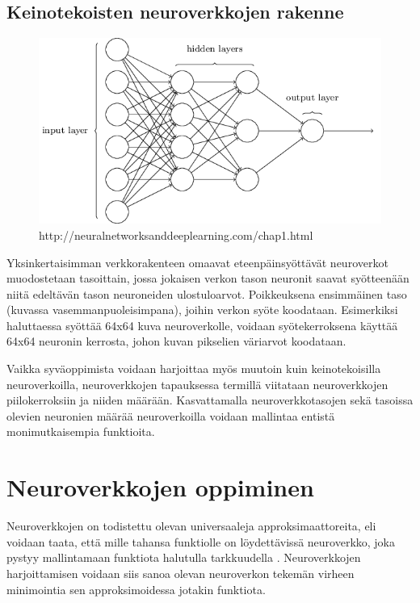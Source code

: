 \documentclass[finnish]{tktltiki2}
\theoremstyle{definition}
\theoremstyle{remark}
\begin{document}
  \subsection{Keinotekoisten neuroverkkojen rakenne}

  \begin{figure}[h]
  \label{pic:neuralnet}
  \centering
  \includegraphics[scale=0.5]{basic-neuralnet}
  \caption{http://neuralnetworksanddeeplearning.com/chap1.html}
  \end{figure}

  Yksinkertaisimman verkkorakenteen omaavat eteenpäinsyöttävät neuroverkot muodostetaan tasoittain, jossa jokaisen verkon tason neuronit saavat syötteenään niitä edeltävän tason neuroneiden ulostuloarvot. Poikkeuksena ensimmäinen taso (kuvassa vasemmanpuoleisimpana), joihin verkon syöte koodataan. Esimerkiksi haluttaessa syöttää 64x64 kuva neuroverkolle, voidaan syötekerroksena käyttää 64x64 neuronin kerrosta, johon kuvan pikselien väriarvot koodataan.

  Vaikka syväoppimista voidaan harjoittaa myös muutoin kuin keinotekoisilla neuroverkoilla, neuroverkkojen tapauksessa termillä viitataan neuroverkkojen piilokerroksiin ja niiden määrään. Kasvattamalla neuroverkkotasojen sekä tasoissa olevien neuronien määrää neuroverkoilla voidaan mallintaa entistä monimutkaisempia funktioita.

  \section{Neuroverkkojen oppiminen}

  Neuroverkkojen on todistettu olevan universaaleja approksimaattoreita, eli voidaan taata, että mille tahansa funktiolle on löydettävissä neuroverkko, joka pystyy mallintamaan funktiota halutulla tarkkuudella \cite{multilayer-feedforward-universal-approximators}. Neuroverkkojen harjoittamisen voidaan siis sanoa olevan neuroverkon tekemän virheen minimointia sen approksimoidessa jotakin funktiota. 
  
\end{document}
